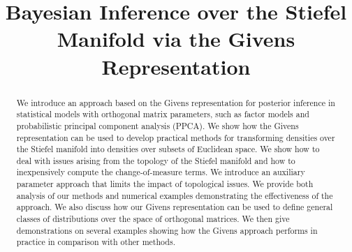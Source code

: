 \documentclass[ba]{imsart}
\numberwithin{equation}{section}
\theoremstyle{plain}
\begin{document}
\begin{frontmatter}
\title{Bayesian Inference over the Stiefel Manifold via the Givens Representation}


\begin{abstract}
We introduce an approach based on the Givens representation for posterior inference in statistical models with orthogonal matrix parameters, such as factor models and probabilistic principal component analysis (PPCA).  We show how the Givens representation can be used to develop practical methods for transforming densities over the Stiefel manifold into densities over subsets of Euclidean space.  We show how to deal with issues arising from the topology of the Stiefel manifold and how to inexpensively compute the change-of-measure terms.  We introduce an auxiliary parameter approach that limits the impact of topological issues.  We provide both analysis of our methods and numerical examples demonstrating the effectiveness of the approach.  We also discuss how our Givens representation can be used to define general classes of distributions over the space of orthogonal matrices.  We then give demonstrations on several examples showing how the Givens approach performs in practice in comparison with other methods.  
\end{abstract}

\begin{keyword}[class=MSC]
\end{keyword}

\begin{keyword}
\kwd{\LaTeXe}
\end{keyword}

\end{frontmatter}
\end{document}
